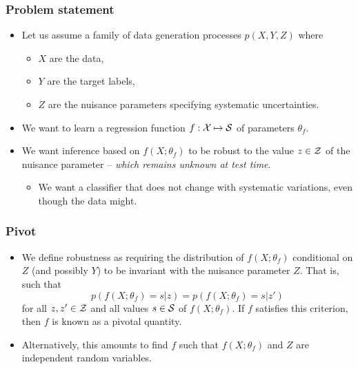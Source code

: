 \documentclass{beamer}
\begin{document}
\begin{frame}
    \frametitle{Problem statement}

    \begin{itemize}
        \item Let us assume a family of data generation processes $p(X, Y, Z)$ where
        \begin{itemize}
            \item $X$ are the data,
            \item $Y$ are the target labels,
            \item $Z$ are the nuisance parameters specifying systematic uncertainties.
        \end{itemize}

        \item We want to learn a regression function $f: {\cal X} \mapsto {\cal S}$ of
        parameters $\theta_f$.

        \item We want inference based on $f(X;\theta_f)$ to be {\color{red} robust}
        to the value $z \in {\cal Z}$ of the nuisance parameter -- {\it which remains unknown at test time}.

        \begin{itemize}
            \item We want a classifier that does not change with systematic variations, even though the data might.
        \end{itemize}
    \end{itemize}
\end{frame}

\begin{frame}
    \frametitle{Pivot}

    \begin{itemize}
        \item     We define robustness as requiring the distribution of $f(X;\theta_f)$
            conditional on $Z$ (and possibly $Y$) to be {\color{red}invariant with the nuisance
            parameter} $Z$.
            That is, such that
            $$p(f(X;\theta_f) = s|z) = p(f(X;\theta_f) = s|z')$$
            for all $z,z' \in {\cal Z}$ and all values $s \in {\cal S}$ of $f(X;\theta_f)$.
            If $f$ satisfies this criterion, then $f$ is known as a {\color{blue} pivotal quantity}.

        \vspace{1cm}

        \item Alternatively, this amounts to find $f$ such that $f(X;\theta_f)$ and $Z$ are {\color{red} independent random variables}.
    \end{itemize}

\end{frame}
\end{document}
